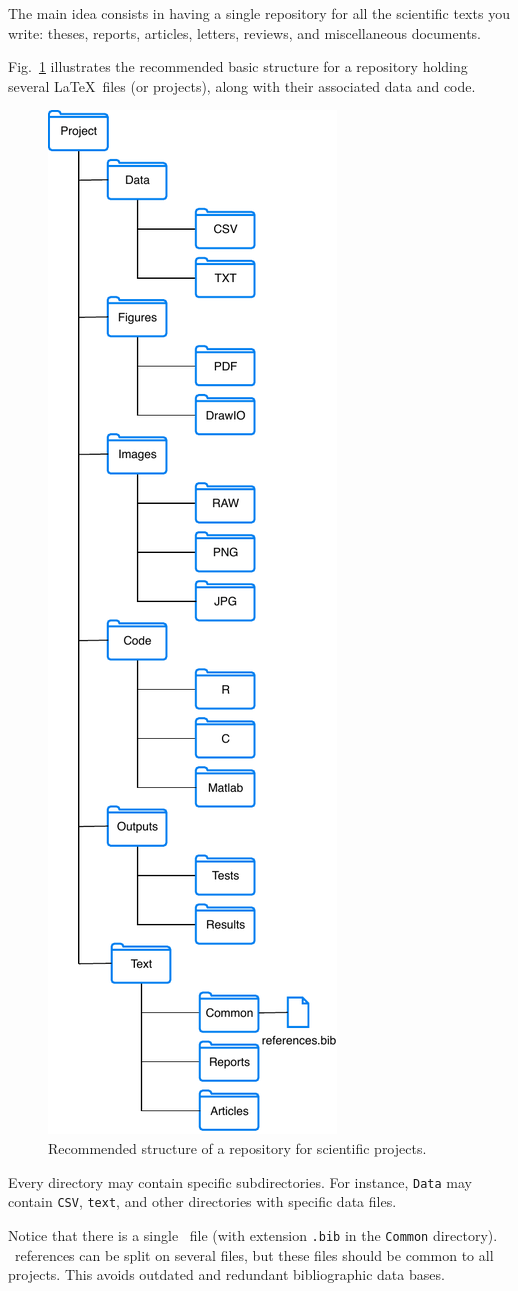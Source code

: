 \documentclass[journal,twoside]{IEEEtran}
\begin{document}
The main idea consists in having a single repository for all the scientific texts you write: 
theses, 
reports, 
articles, 
letters,
reviews,
and miscellaneous documents.

Fig.~\ref{Fig:StructRepo} illustrates the recommended basic structure for a repository holding several \LaTeX\ files (or projects), along with their associated data and code.

\begin{figure}[hbt]
	\centering
	\includegraphics[width=.35\columnwidth]{DirectoryStructure}
	\caption{Recommended structure of a repository for scientific projects.}\label{Fig:StructRepo}
\end{figure}

Every directory may contain specific subdirectories.
For instance, \verb|Data| may contain \verb|CSV|, \verb|text|, and other directories with specific data files.

Notice that there is a single \BibTeX\ file (with extension \verb|.bib| in the \verb|Common| directory).
\BibTeX\ references can be split on several files, but these files should be common to all projects.
This avoids outdated and redundant bibliographic data bases.
\end{document}
